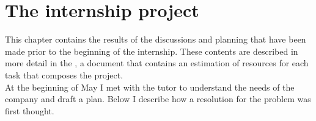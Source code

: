 
\chapter{The internship project}



This chapter contains the results of the discussions and planning that have been made prior to the beginning of the internship.
These contents are described in more detail in the , a document that contains an estimation of resources for each task that composes the project.\\
At the beginning of May I met with the tutor to understand the needs of the company and draft a plan.
Below I describe how a resolution for the problem was first thought.

